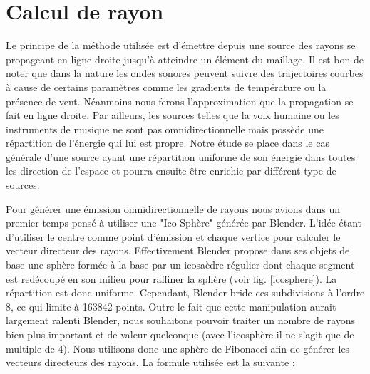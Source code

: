 \section{Calcul de rayon} \label{sect_rayon}
Le principe de la méthode utilisée est d'émettre depuis une source des rayons se propageant en ligne droite jusqu'à atteindre un élément du maillage. Il est bon de noter que dans la nature les ondes sonores peuvent suivre des trajectoires courbes à cause de certains paramètres comme les gradients de température ou la présence de vent. Néanmoins nous ferons l'approximation que la propagation se fait en ligne droite. Par ailleurs, les sources telles que la voix humaine ou les instruments de musique ne sont pas omnidirectionnelle mais possède une répartition de l'énergie qui lui est propre. Notre étude se place dans le cas générale d'une source ayant une répartition uniforme de son énergie dans toutes les direction de l'espace et pourra ensuite être enrichie par différent type de sources. 

Pour générer une émission omnidirectionnelle de rayons nous avions dans un premier temps pensé à utiliser une "Ico Sphère" générée par Blender. L'idée étant d'utiliser le centre comme point d'émission et chaque vertice pour calculer le vecteur directeur des rayons. Effectivement Blender propose dans ses objets de base une sphère formée à la base par un icosaèdre régulier dont chaque segment est redécoupé en son milieu pour raffiner la sphère (voir fig. \ref{icosphere}). La répartition est donc uniforme. Cependant, Blender bride ces subdivisions à l'ordre 8, ce qui limite à 163842 points. Outre le fait que cette manipulation aurait largement ralenti Blender, nous souhaitons pouvoir traiter un nombre de rayons bien plus important et de valeur quelconque (avec l'icosphère il ne s'agit que de multiple de 4). Nous utilisons donc une sphère de Fibonacci afin de générer les vecteurs directeurs des rayons. La formule utilisée est la suivante :

